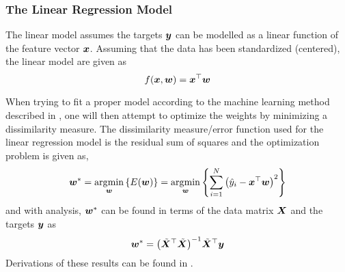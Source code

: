 \subsubsection{The Linear Regression Model}
The linear model assumes the targets $\bm{y}$ can be modelled as a linear function of the feature vector $\bm{x}$. Assuming that the data has been standardized (centered), the linear model are given as 
\begin{equation}\label{eq:lin_standard}
    f\qty(\bm{x},\boldsymbol{w}) = \bm{x}^{\top} \boldsymbol{w}
\end{equation}

When trying to fit a proper model according to the machine learning method described in , one will then attempt to optimize the weights by minimizing a dissimilarity measure. The dissimilarity measure/error function used for the linear regression model is the residual sum of squares and the optimization problem is given as, 
\begin{equation}
    \boldsymbol{w}^* = \operatorname*{\arg\!\min}_{\boldsymbol{w}} \left\{ {E\qty(\boldsymbol{w})} \right\} = \operatorname*{\arg\!\min}_{\boldsymbol{w}} \left\{ {\sum_{i=1}^{N} \qty(\hat{y}_i-\bm{x}^{\top} \boldsymbol{w})^2} \right\}
\end{equation}
and with analysis, $\boldsymbol{w}^*$ can be found in terms of the data matrix $\bm{X}$ and the targets $\bm{y}$ as
\begin{equation}\label{eq:non_penalized_lin_model}
    \boldsymbol{w}^* = \qty( \tilde{\bm{X}}^{\top} \tilde{\bm{X}} )^{-1} \tilde{\bm{X}}^{\top} \bm{y}
\end{equation}
Derivations of these results can be found in . 


